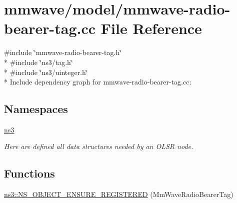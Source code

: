 \hypertarget{mmwave-radio-bearer-tag_8cc}{}\section{mmwave/model/mmwave-\/radio-\/bearer-\/tag.cc File Reference}
\label{mmwave-radio-bearer-tag_8cc}
{\ttfamily \#include \char`\"{}mmwave-\/radio-\/bearer-\/tag.\+h\char`\"{}}\\*
{\ttfamily \#include \char`\"{}ns3/tag.\+h\char`\"{}}\\*
{\ttfamily \#include \char`\"{}ns3/uinteger.\+h\char`\"{}}\\*
Include dependency graph for mmwave-\/radio-\/bearer-\/tag.cc\+:
\subsection*{Namespaces}
\begin{DoxyCompactItemize}
\item 
 \hyperlink{namespacens3}{ns3}
\begin{DoxyCompactList}\small\item\em Here are defined all data structures needed by an O\+L\+SR node. \end{DoxyCompactList}\end{DoxyCompactItemize}
\subsection*{Functions}
\begin{DoxyCompactItemize}
\item 
\hyperlink{namespacens3_a03b82474ffe9b79e3916d40b594b3361}{ns3\+::\+N\+S\+\_\+\+O\+B\+J\+E\+C\+T\+\_\+\+E\+N\+S\+U\+R\+E\+\_\+\+R\+E\+G\+I\+S\+T\+E\+R\+ED} (Mm\+Wave\+Radio\+Bearer\+Tag)
\end{DoxyCompactItemize}
